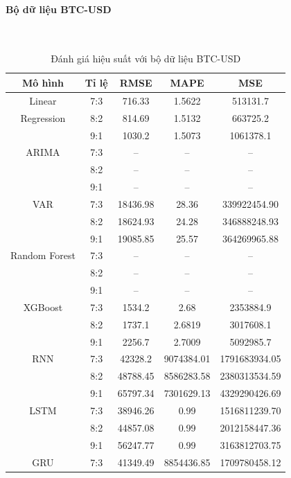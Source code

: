 \documentclass[conference]{IEEEtran}
\begin{document}
\begin{table}[H]
\begin{adjustbox}{width=0.4\textwidth}
\begin{tabular}{|c|c|c|c|c|}
\end{tabular}
\end{adjustbox}
\end{table}

\paragraph{\textbf{Bộ dữ liệu BTC-USD}} \mbox{} \\
\begin{table}[H]
 \centering
 \caption{Đánh giá hiệu suất với bộ dữ liệu BTC-USD}
\begin{adjustbox}{width=0.4\textwidth}
\begin{tabular}{|c|c|c|c|c|}
\hline
Mô hình & Tỉ lệ & RMSE & MAPE & MSE \\ \hline
Linear & 7:3 & 716.33 & 1.5622 & 513131.7 \\
Regression & 8:2 & 814.69 & 1.5132 & 663725.2 \\
& 9:1 & 1030.2 & 1.5073 & 1061378.1 \\ \hline
ARIMA & 7:3 & -- & -- & -- \\
& 8:2 & -- & -- & -- \\
& 9:1 & -- & -- & -- \\ \hline
VAR & 7:3 & 18436.98 & 28.36 & 339922454.90 \\
& 8:2 & 18624.93 & 24.28 & 346888248.93 \\
& 9:1 & 19085.85 & 25.57 & 364269965.88 \\ \hline
Random Forest & 7:3 & -- & -- & -- \\
& 8:2 & -- & -- & -- \\
& 9:1 & -- & -- & -- \\ \hline
XGBoost & 7:3 & 1534.2 & 2.68 & 2353884.9 \\
& 8:2 & 1737.1 & 2.6819 & 3017608.1 \\
& 9:1 & 2256.7 & 2.7009 & 5092985.7 \\ \hline
RNN & 7:3 & 42328.2 & 9074384.01 & 1791683934.05 \\
& 8:2 & 48788.45 & 8586283.58 & 2380313534.59 \\
& 9:1 & 65797.34 & 7301629.13 & 4329290426.69 \\ \hline
LSTM & 7:3 & 38946.26 & 0.99 & 1516811239.70 \\
& 8:2 & 44857.08 & 0.99 & 2012158447.36 \\
& 9:1 & 56247.77 & 0.99 & 3163812703.75 \\ \hline
GRU & 7:3 & 41349.49 & 8854436.85 & 1709780458.12 \\

\end{tabular}
\end{adjustbox}
\end{table}
\end{document}
